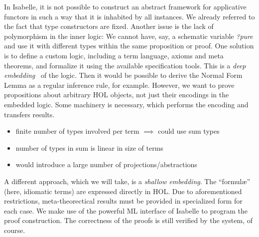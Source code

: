 In Isabelle, it is not possible to construct an abstract framework for
applicative functors in such a way that it is inhabited by all instances.
We already referred to the fact that type constructors are fixed.
Another issue is the lack of polymorphism in the inner logic:
We cannot have, say, a schematic variable \textit{?pure} and use it with
different types within the same proposition or proof.
One solution is to define a custom logic, including a term language, axioms
and meta theorems, and formalize it using the available specification tools.
This is a \emph{deep embedding}~\cite{wildmoser04} of the logic.
Then it would be possible to derive the Normal Form Lemma as a regular
inference rule, for example.
However, we want to prove propositions about arbitrary HOL objects, not just
their encodings in the embedded logic.
Some machinery is necessary, which performs the encoding and transfers results.
\begin{itemize}
\item finite number of types involved per term $\implies$ could use sum types
\item number of types in sum is linear in size of terms
\item would introduce a large number of projections/abstractions
\end{itemize}
\todo

A different approach, which we will take, is a \emph{shallow embedding}.
The ``formul\ae'' (here, idiomatic terms) are expressed directly in HOL.
Due to aforementioned restrictions, meta-theorectical results must be provided
in specialized form for each case.
We make use of the powerful ML interface of Isabelle to program the proof
construction.
The correctness of the proofs is still verified by the system, of course.
